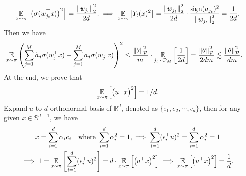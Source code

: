 \begin{answer}
    \begin{align*}
        \operatorname*{\mathbb{E}}_{x\sim \pi}\left[\left(\sigma(w_{j_t}^\top x)\right)^2\right] = \frac{\norm{w_{j_t}}_2^2}{2d}. \implies \operatorname*{\mathbb{E}}_{x\sim \pi}\left[Y_t(x)^2\right] = \frac{\norm{w_{j_t}}_2^2}{2d} \cdot \frac{\text{sign}(a_{j_t})^2}{\norm{w_{j_t}}_2^2} = \frac{1}{2d}.
    \end{align*}
    Then we have
    \begin{align*}
        \operatorname*{\mathbb{E}}_{x\sim \pi} \left( \sum_{j=1}^M \tilde{a}_j \sigma(w_j^{\top} x) - \sum_{j=1}^M a_j \sigma(w_j^{\top} x) \right)^2 &\le \frac{\norm{\theta}_{\mathcal{P}}^2}{m} \cdot  \operatorname*{\mathbb{E}}_{j_t\sim \mathcal{D}_M}\left[\frac{1}{2d}\right] = \frac{\norm{\theta}_{\mathcal{P}}^2}{2dm} \lesssim \frac{\norm{\theta}_{\mathcal{P}}^2}{dm}.
    \end{align*}
    At the end, we prove that 
    \[
        \operatorname*{\mathbb{E}}_{x\sim \pi} \left[\left(u^\top x\right)^2\right] = 1/d.
    \]
    Expand $u$ to $d$-orthonormal basis of $\mathbb{R}^d$, denoted as $\{e_1, e_2, \cdots, e_d\}$, then for any given $x \in \mathbb{S}^{d-1}$, we have
    \begin{gather*}
        x = \sum_{i=1}^d \alpha_i e_i \quad \text{where } \sum_{i=1}^d \alpha_i^2 = 1, \implies \sum_{i=1}^{d} (e_i^\top u)^2 = \sum_{i=1}^{d} \alpha_i^2 = 1 \\
        \implies 1 = \operatorname*{\mathbb{E}}_{x\sim \pi} \left[\sum_{i=1}^{d} (e_i^\top u)^2 \right] = d \cdot \operatorname*{\mathbb{E}}_{x\sim \pi} \left[\left(u^\top x\right)^2\right]  \implies \operatorname*{\mathbb{E}}_{x\sim \pi} \left[\left(u^\top x\right)^2\right] = \frac{1}{d}.
    \end{gather*}
    \ed
\end{answer}